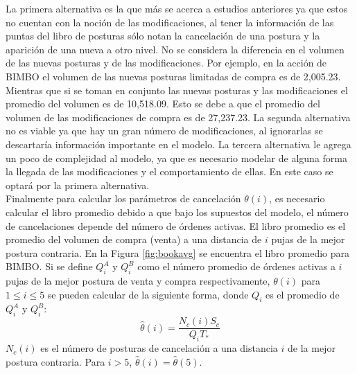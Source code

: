 \documentclass[11pt]{article}
\numberwithin{equation}{section} %
\begin{document}
La primera alternativa es la que más se acerca a estudios anteriores ya que estos no cuentan con la noción de las modificaciones, al tener la información de las puntas del libro de posturas sólo notan la cancelación de una postura y la aparición de una nueva a otro nivel. No se considera la diferencia en el volumen de las nuevas posturas y de las modificaciones. Por ejemplo, en la acción de BIMBO el volumen de las nuevas posturas limitadas de compra es de 2,005.23. Mientras que si se toman en conjunto las nuevas posturas y las modificaciones el promedio del volumen es de 10,518.09. Esto se debe a que el promedio del volumen de las modificaciones de compra es de 27,237.23. La segunda alternativa no es viable ya que hay un gran número de modificaciones, al ignorarlas se descartaría información importante en el modelo. La tercera alternativa le agrega un poco de complejidad al modelo, ya que es necesario modelar de alguna forma la llegada de las modificaciones y el comportamiento de ellas. En este caso se optará por la primera alternativa.\\

Finalmente para calcular los parámetros de cancelación $\theta(i)$, es necesario calcular el libro promedio debido a que bajo los supuestos del modelo, el número de cancelaciones depende del número de órdenes activas. El libro promedio es el promedio del volumen de compra (venta) a una distancia de $i$ pujas de la mejor postura contraria. En la Figura \ref{fig:bookavg} se encuentra el libro promedio para BIMBO. Si se define $Q_i^A$ y $Q_i^B$ como el número promedio de órdenes activas a $i$ pujas de la mejor postura de venta y compra respectivamente,  $\theta(i)$ para $1\leq i \leq 5$ se pueden calcular de la siguiente forma, donde $Q_i$ es el promedio de $Q_i^A$ y $Q_i^B$:
\[
\hat{\theta}(i)=\frac{N_c(i) S_c}{Q_i T_*}
\]
$N_c(i)$ es el número de posturas de cancelación a una distancia $i$ de la mejor postura contraria. Para $i>5$, $\hat{\theta}(i)=\hat{\theta}(5)$.\\
\end{document}
